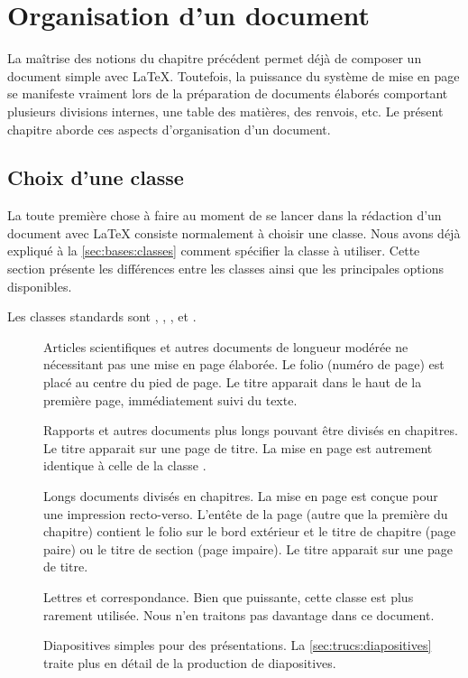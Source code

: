 \chapter{Organisation d'un document}
\label{chap:organisation}

La maîtrise des notions du chapitre précédent permet déjà de composer
un document simple avec {\LaTeX}. Toutefois, la puissance du système
de mise en page se manifeste vraiment lors de la préparation de
documents élaborés comportant plusieurs divisions internes, une table
des matières, des renvois, etc. Le présent chapitre aborde ces aspects
d'organisation d'un document.

\section{Choix d'une classe}
\label{sec:organisation:classe}

La toute première chose à faire au moment de se lancer dans la
rédaction d'un document avec {\LaTeX} consiste normalement à choisir
une classe. Nous avons déjà expliqué à la \autoref{sec:bases:classes}
comment spécifier la classe à utiliser. Cette section présente les
différences entre les classes ainsi que les principales options
disponibles.

Les classes standards sont , ,
,  et .

\begin{description}
\item[\normalfont{}] Articles scientifiques et autres
  documents de longueur modérée ne nécessitant pas une mise en page
  élaborée. Le folio (numéro de page) est placé au centre du pied de
  page. Le titre apparait dans le haut de la première page,
  immédiatement suivi du texte.
\item[\normalfont{}] Rapports et autres documents plus
  longs pouvant être divisés en chapitres. Le titre apparait sur une
  page de titre. La mise en page est autrement identique à celle de la
  classe .
\item[\normalfont{}] Longs documents divisés en chapitres.
  La mise en page est conçue pour une impression recto-verso. L'entête
  de la page (autre que la première du chapitre) contient le folio sur
  le bord extérieur et le titre de chapitre (page paire) ou le titre
  de section (page impaire). Le titre apparait sur une page de titre.
\item[\normalfont{}] Lettres et correspondance. Bien que
  puissante, cette classe est plus rarement utilisée. Nous n'en traitons
  pas davantage dans ce document.
\item[\normalfont{}] Diapositives simples pour des
  présentations. La \autoref{sec:trucs:diapositives} traite plus en
  détail de la production de diapositives.
\end{description}

